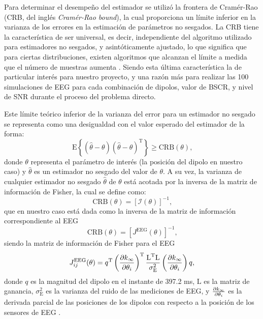 Para determinar el desempeño del estimador se utilizó la frontera de Cramér-Rao (CRB, del inglés \emph{Cramér-Rao bound}), la cual proporciona un límite inferior en la varianza de los errores en la estimación de parámetros no sesgados.
La CRB tiene la característica de ser universal, es decir, independiente del algoritmo utilizado para estimadores no sesgados, y asintóticamente ajustado, lo que significa que para ciertas distribuciones, existen algoritmos que alcanzan el límite a medida que el número de muestras aumenta \cite{Muravchik1999, Escalona-Vargas2013}.
Siendo esta última característica la de particular interés para nuestro proyecto, y una razón más para realizar las 100 simulaciones de EEG para cada combinación de dipolos, valor de BSCR, y nivel de SNR durante el proceso del problema directo.

Este límite teórico inferior de la varianza del error para un estimador no sesgado se representa como una desigualdad con el valor esperado del estimador de la forma:
\begin{equation}
	\label{eq:crb2}
	\text{E}\left\{(\hat{\theta} - \theta)(\hat{\theta} - \theta)^{\text{T}}\right\} \geq \text{CRB}(\theta)\text{,}
\end{equation}
donde ${\theta}$ representa el parámetro de interés (la posición del dipolo en nuestro caso) y $\hat{\theta}$ es un estimador no sesgado del valor de $\theta$. A su vez, la varianza de cualquier estimador no sesgado $\hat{\theta}$ de $\theta$ está acotada por la inversa de la matriz de información de Fisher, la cual se define como:
\begin{equation}
	\label{eq:crb}
	\text{CRB}(\theta) = \left[\mathcal{I}(\theta)\right]^{-1}\text{,}
\end{equation} 
que en nuestro caso está dada como la inversa de la matriz de información correspondiente al EEG
\begin{equation}
	\label{eq:crbj}
	\text{CRB}(\theta) = [J^{\text{EEG}}(\theta)]^{-1}\text{,}
\end{equation} 
siendo la matriz de información de Fisher para el EEG
\begin{equation}
	\label{eq:fisher}
	J_{ij}^{\text{EEG}}(\theta) = q^{\text{T}}\left(\pdv{k_{\infty}}{\theta_{i}}\right)^{\text{T}}\frac{\text{L}^{\text{T}}\text{L}}{\sigma^2_{\text{E}}}\left(\pdv{k_{\infty}}{\theta_{i}}\right)q\text{,}
\end{equation}
donde $q$ es la magnitud del dipolo en el instante de 397.2 ms, $\text{L}$ es la matriz de ganancia, $\sigma^2_{\text{E}}$ es la varianza del ruido de las mediciones de EEG, y $\pdv{k_{\infty}}{\theta_{i}}$ es la derivada parcial de las posiciones de los dipolos con respecto a la posición de los sensores de EEG \cite{nielsenCramerRaoLowerBound2013, Stoica1988, Muravchik1999}. 

